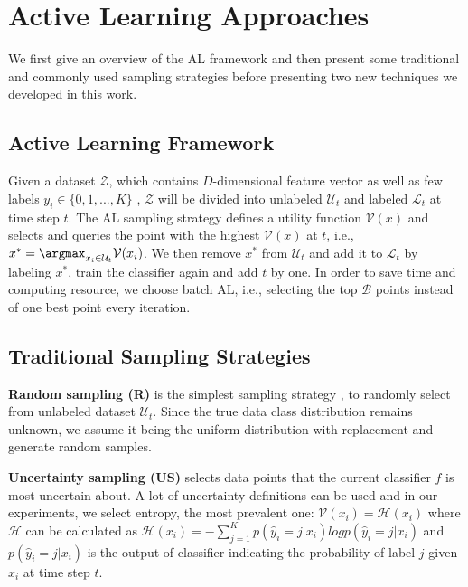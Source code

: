 \section{Active Learning Approaches}
\label{sec:approach}
We first give an overview of the AL framework and then present some 
traditional and commonly used sampling strategies before presenting 
two new techniques we developed in this work. 

\subsection{Active Learning Framework}

Given a dataset $ \mathcal{Z}$, which contains $D$-dimensional feature vector as well as few labels $y_i \in \{0,1,...,K\}$ , 
$\mathcal{Z}$ will be divided into unlabeled $\mathcal{U}_t$ and 
labeled $\mathcal{L}_t$ at time step $t$. 
The AL sampling strategy defines a utility function $\mathcal{V}(x)$ and selects and queries 
the point with the highest $\mathcal{V}(x)$ at $t$, i.e., $x^*=\argmax_{x_i\in\mathcal{U}_t}\mathcal{V}(x_i)$.
We then remove $x^*$ from $\mathcal{U}_t$ and 
add it to $\mathcal{L}_t$ by labeling $x^*$, train the classifier again and add $t$ by one. In order to save time and computing resource, we choose batch AL, i.e., selecting 
the top $\mathcal{B}$ points 
instead of one best point every iteration.


\subsection{Traditional Sampling Strategies}

\textbf{Random sampling (R)} is the simplest sampling strategy , to randomly select from unlabeled dataset 
$\mathcal{U}_t$. Since the true data class distribution remains unknown, 
we assume it being the uniform distribution with replacement and generate random samples.

\noindent
\textbf{Uncertainty sampling (US)} selects data points that the current classifier $f$ 
is most uncertain about. A lot of uncertainty definitions can be used and 
in our experiments, we select entropy, the most prevalent one: 
$\mathcal{V}(x_i) =  \mathcal{H}(x_i)$
    where $\mathcal{H}$ can be calculated as $ \mathcal{H}(x_i) = -\sum_{j=1}^K p(\hat{y}_i=j|x_i) log  p(\hat{y}_i=j|x_i)$ and $p(\hat{y}_i=j|x_i)$ is the output of classifier indicating the probability of label $j$ given $x_i$ at time step $t$.
    
